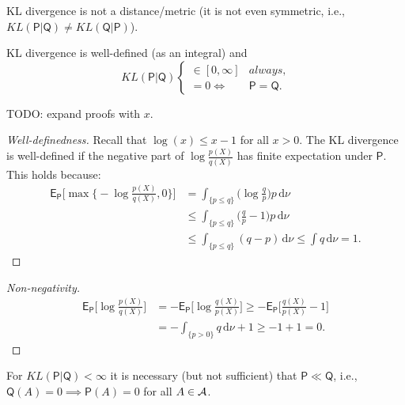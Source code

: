 \begin{note}
    KL divergence is not a distance/metric (it is not even symmetric, i.e., $KL(\mathsf{P}|\mathsf{Q}) \neq KL(\mathsf{Q}|\mathsf{P})$).
\end{note}

\begin{lemma}
    KL divergence is well-defined (as an integral) and
    \[
    KL(\mathsf{P}|\mathsf{Q}) \begin{cases} \in [0,\infty] & \textit{always}, \\ = 0  \iff& \mathsf{P} = \mathsf{Q}. \end{cases}
    \]
\end{lemma}

TODO: expand proofs with \(x\).
\begin{proof}[Well-definedness]
    Recall that $\log(x) \le x - 1$ for all $x > 0$. The KL divergence is well-defined if the negative part of $\log \frac{p(X)}{q(X)}$ has finite expectation under $\mathsf{P}$. This holds because:
    \[\begin{split} 
    \mathsf{E}_{\mathsf{P}} \bigg[ \max \bigg\{ -\log \frac{p(X)}{q(X)}, 0 \bigg\} \bigg] &= \int_{\{p \le q\}} \bigg( \log \frac{q}{p} \bigg) p \, \mathrm{d}\nu \\ 
    &\leq \int_{\{p \le q\}} \bigg( \frac{q}{p} - 1 \bigg) p \, \mathrm{d}\nu \\ 
    &\leq \int_{\{p \le q\}} (q - p) \, \mathrm{d}\nu \leq \int q \, \mathrm{d}\nu = 1. 
    \end{split}\]
\end{proof}

\begin{proof}[Non-negativity]
    \[\begin{aligned} 
    \mathsf{E}_{\mathsf{P}}\bigg[\log\frac{p(X)}{q(X)}\bigg] &= -\mathsf{E}_{\mathsf{P}}\bigg[\log\frac{q(X)}{p(X)}\bigg] \geq -\mathsf{E}_{\mathsf{P}}\bigg[\frac{q(X)}{p(X)} - 1\bigg] \\ 
    &= -\int_{\{p > 0\}} q \, \mathrm{d}\nu + 1 \geq -1 + 1 = 0. 
    \end{aligned}\]
\end{proof}

\begin{note}[]
    For \(KL(\mathsf{P}|\mathsf{Q}) < \infty\) it is necessary (but not sufficient) that \(\mathsf{P}\ll \mathsf{Q}\), i.e., \(\mathsf{Q}(A) = 0 \implies \mathsf{P}(A) = 0\) for all \(A \in \mathcal{A}\).
\end{note}

